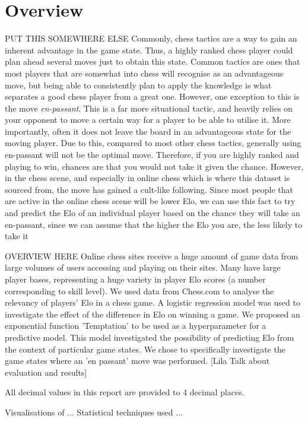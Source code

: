 \documentclass[10pt,a4paper,twocolumn]{article}
\begin{document}
\section{Overview}
PUT THIS SOMEWHERE ELSE
Commonly, chess tactics are a way to gain an inherent advantage in the game state. Thus, a highly ranked chess player could plan ahead several moves just to obtain this state. Common tactics are ones that most players that are somewhat into chess will recognise as an advantageous move, but being able to consistently plan to apply the knowledge is what separates a good chess player from a great one. However, one exception to this is the move \textit{en-passant}. This is a far more situational tactic, and heavily relies on your opponent to move a certain way for a player to be able to utilise it. More importantly, often it does not leave the board in an advantageous state for the moving player. Due to this, compared to most other chess tactics, generally using en-passant will not be the optimal move. Therefore, if you are highly ranked and playing to win, chances are that you would not take it given the chance. However, in the chess scene, and especially in online chess which is where this dataset is sourced from, the move has gained a cult-like following. Since most people that are active in the online chess scene will be lower Elo, we can use this fact to try and predict the Elo of an individual player based on the chance they will take an en-passant, since we can assume that the higher the Elo you are, the less likely to take it


OVERVIEW HERE
Online chess sites receive a huge amount of game data from large volumes of users accessing and playing on their sites. Many have large player bases, representing a huge variety in player Elo scores (a number corresponding to skill level). We used data from Chess.com to analyse the relevancy of players' Elo in a chess game. A logistic regression model was used to investigate the effect of the difference in Elo on winning a game. We proposed an exponential function 'Temptation' to be used as a hyperparameter for a predictive model. This model investigated the possibility of predicting Elo from the context of particular game states. We chose to specifically investigate the game states where an 'en passant' move was performed. [Lila Talk about evaluation and results]

All decimal values in this report are provided to 4 decimal places.

Visualisations of ...
Statistical techniques used ...
\end{document}
